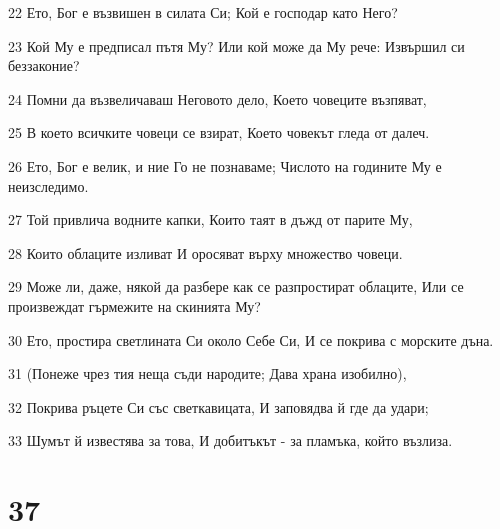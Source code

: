 \par 22 Ето, Бог е възвишен в силата Си; Кой е господар като Него?
\par 23 Кой Му е предписал пътя Му? Или кой може да Му рече: Извършил си беззаконие?
\par 24 Помни да възвеличаваш Неговото дело, Което човеците възпяват,
\par 25 В което всичките човеци се взират, Което човекът гледа от далеч.
\par 26 Ето, Бог е велик, и ние Го не познаваме; Числото на годините Му е неизследимо.
\par 27 Той привлича водните капки, Които таят в дъжд от парите Му,
\par 28 Които облаците изливат И оросяват върху множество човеци.
\par 29 Може ли, даже, някой да разбере как се разпростират облаците, Или се произвеждат гърмежите на скинията Му?
\par 30 Ето, простира светлината Си около Себе Си, И се покрива с морските дъна.
\par 31 (Понеже чрез тия неща съди народите; Дава храна изобилно),
\par 32 Покрива ръцете Си със светкавицата, И заповядва й где да удари;
\par 33 Шумът й известява за това, И добитъкът - за пламъка, който възлиза.

\chapter{37}

